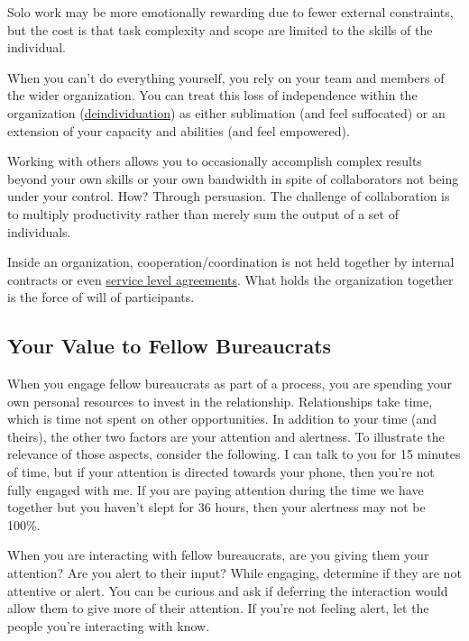 Solo work may be more emotionally rewarding due to fewer external constraints, but the cost is that task complexity and scope are limited to the skills of the individual. 


When you can't do everything yourself, you rely on your team and members of the wider organization. You can treat this loss of independence within the organization (\href{https://en.wikipedia.org/wiki/Deindividuation}{deindividuation}) 
as either sublimation (and feel suffocated) or an extension of your capacity and abilities (and feel empowered).

Working with others allows you to occasionally accomplish complex results beyond your own skills or your own bandwidth in spite of collaborators not being under your control. How? Through persuasion. 
The challenge of collaboration is to multiply productivity rather than merely sum the output of a set of individuals. 

Inside an organization, cooperation/coordination is not held together by internal contracts or even \href{https://en.wikipedia.org/wiki/Service-level_agreement}{service level agreements}. 
What holds the organization together is the force of will of participants. 


\subsection*{Your Value to Fellow Bureaucrats}

When you engage fellow bureaucrats as part of a process, you are spending your own personal resources to invest in the relationship. Relationships take time, which is time not spent on other opportunities. In addition to your time (and theirs), the other two factors are your attention and alertness. To illustrate the relevance of those aspects, consider the following. I can talk to you for 15 minutes of time, but if your attention is directed towards your phone, then you're not fully engaged with me. If you are paying attention during the time we have together but you haven't slept for 36 hours, then your alertness may not be 100\%. 

When you are interacting with fellow bureaucrats, are you giving them your attention? Are you alert to their input? While engaging, determine if they are not attentive or alert. You can be curious and ask if deferring the interaction would allow them to give more of their attention. If you're not feeling alert, let the people you're interacting with know.


